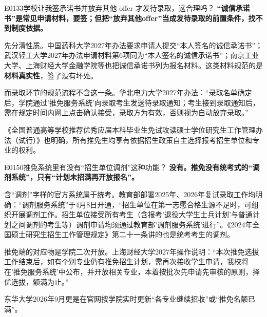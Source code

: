 \begin{qa}{E0133}{学校让我签承诺书并放弃其他 offer 才发待录取，这合理吗？}
\textbf{“诚信承诺书”是常见申请材料，要签；但把“放弃其他offer”当成发待录取的前置条件，找不到制度依据。}

先分清性质。中国药科大学2027年办法要求申请人提交“本人签名的诚信承诺书”；武汉轻工大学2027年办法申请材料第6项同为“本人签名的诚信承诺书”；南京工业大学、上海财经大学金融学院等也把诚信承诺书列为报名材料。这类材料规范的是\textbf{材料真实性}，签了没有坏处。

而录取环节的规范流程不含这一条。华北电力大学2027年办法：“录取名单确定后，学院通过'推免服务系统'向录取考生发送待录取通知；考生接到录取通知后，需在规定时间内网上点击确认接受，录取方为有效，否则视为自动放弃录取。”

《全国普通高等学校推荐优秀应届本科毕业生免试攻读硕士学位研究生工作管理办法（试行）》也明确，所有推免生均享有依据招生政策自主选择报考招生单位和专业的权利。
\end{qa}

\begin{qa}{E0150}{推免系统里有没有“招生单位调剂”这种功能？}
\textbf{没有。推免没有统考式的“调剂系统”，只有“计划未招满再开放报名”。}

含“调剂”字样的官方系统属于统考。教育部部署2025年、2026年复试录取工作均明确：“调剂服务系统”于4月8日开通，“招生单位在第一志愿合格生源不足时，可组织开展调剂工作。招生单位接受所有考生（含报考'退役大学生士兵计划'与普通计划之间调剂的考生等）调剂申请均须通过教育部'调剂服务系统'进行”。《2024年全国硕士研究生招生工作管理规定》第二十一条讲的也是统考考生的调剂。

推免端的对应物是学院二次开放。上海财经大学2027年操作说明：“本次推免选拔工作结束后，如有个别专业仍有推免招生计划，需再次接收学生申请，我校将在'推免服务系统'中公布，并开放相关专业，本着按批次先申请先审核的原则，择优选拔，额满为止。”

东华大学2026年9月更是在官网按学院实时更新“各专业继续招收”或“推免名额已满”。
\end{qa}

